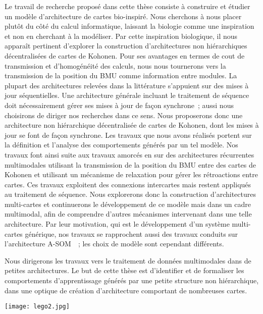 \documentclass[../main]{subfiles}
\begin{document}
Le travail de recherche proposé dans cette thèse consiste à construire et étudier un modèle d'architecture de cartes bio-inspiré.
Nous cherchons  à nous placer plutôt du côté du calcul informatique, laissant la biologie comme une inspiration et non en cherchant à la modéliser. 
Par cette inspiration biologique, il nous apparaît pertinent d'explorer la construction d'architectures non hiérarchiques décentralisées de cartes de Kohonen. Pour ses avantages en termes de cout de transmission et d'homogénéité des calculs, nous nous tournerons vers la transmission de la position du BMU comme information entre modules.
La plupart des architectures relevées dans la littérature s'appuient sur des mises à jour séquentielles. 
Une architecture générale incluant le traitement de séquence doit nécessairement gérer ses mises à jour de façon synchrone~; aussi nous choisirons de diriger nos recherches dans ce sens.
Nous proposerons donc une architecture non hiérarchique décentralisée de cartes de Kohonen, dont les mises à jour se font de façon synchrone. Les travaux que nous avons réalisés portent sur la définition et l'analyse des comportements générés par un tel modèle.
Nos travaux font ainsi suite aux travaux amorcés en \cite{baheux_towards_2014} sur des architectures récurrentes multimodales utilisant la transmission de la position du BMU entre des cartes de Kohonen et utilisant un mécanisme de relaxation pour gérer les rétroactions entre cartes.
Ces travaux exploitent des connexions intercartes mais restent appliqués au traitement de séquence.
Nous explorerons donc la construction d'architectures multi-cartes et continuerons le développement de ce modèle mais dans un cadre multimodal, afin de comprendre d'autres mécanismes intervenant dans une telle architecture.
Par leur motivation, qui est le développement d'un système multi-cartes générique, nos travaux se rapprochent aussi des travaux conduits sur l'architecture A-SOM~\cite{johnsson_associating_2008, johnsson_associative_2009,gil_sarasom_2015, Buonamente2015DiscriminatingAS}~; les choix de modèle sont cependant différents.

Nous dirigerons les travaux vers le traitement de données multimodales dans de petites architectures. 
Le but de cette thèse est d'identifier et de formaliser les comportements d'apprentissage générés par une petite structure non hiérarchique, dans une optique de création d'architecture comportant de nombreuses cartes.

\begin{figure*}[b]
    \centering\texttt{[image: lego2.jpg]}
\end{figure*}

\ifSubfilesClassLoaded{
    \printbibliography
}{}
\end{document}
